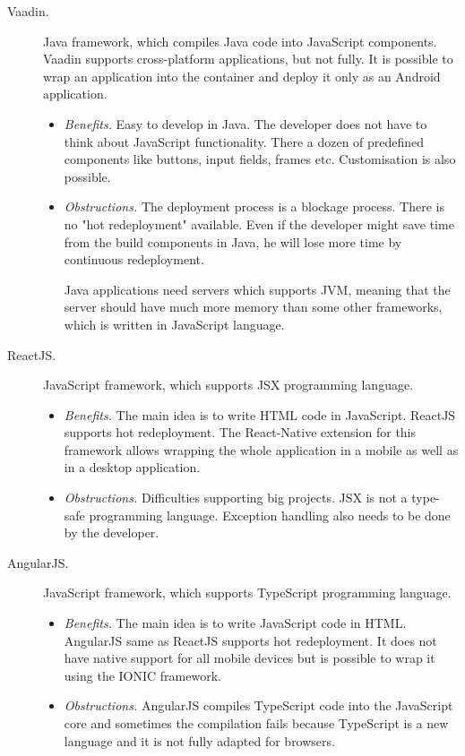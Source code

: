 \begin{description}
\item[Vaadin.] Java framework, which compiles Java code into JavaScript components. Vaadin supports cross-platform applications, but not fully. It is possible to wrap an application into the container and deploy it only as an Android application.

\begin{itemize}
\item \emph{Benefits.} Easy to develop in Java. The developer does not have to think about JavaScript functionality. There a dozen of predefined components like buttons, input fields, frames etc. Customisation is also possible. 
\item \emph{Obstructions.} The deployment process is a blockage process. There is no "hot redeployment" available. Even if the developer might save time from the build components in Java, he will lose more time by continuous redeployment. 

Java applications need servers which supports JVM, meaning that the server should have much more memory than some other frameworks, which is written in JavaScript language.  
\end{itemize}

\item[ReactJS.]  JavaScript framework, which supports JSX programming language. 
\begin{itemize} 
\item \emph{Benefits.} The main idea is to write HTML code in JavaScript. ReactJS supports hot redeployment. The React-Native extension for this framework allows wrapping the whole application in a mobile as well as in a desktop application.
\item \emph{Obstructions.} Difficulties supporting big projects. JSX is not a type-safe programming language. Exception handling also needs to be done by the developer.  
\end{itemize}
\item[AngularJS.] JavaScript framework, which supports TypeScript programming language.
\begin{itemize} 
\item \emph{Benefits.} The main idea is to write JavaScript code in HTML.  AngularJS same as ReactJS supports hot redeployment. It does not have native support for all mobile devices but is possible to wrap it using the IONIC framework. 
\item \emph{Obstructions.}  AngularJS compiles TypeScript code into the JavaScript core and sometimes the compilation fails because TypeScript is a new language and it is not fully adapted for browsers. 
\end{itemize}
\end{description}
 
